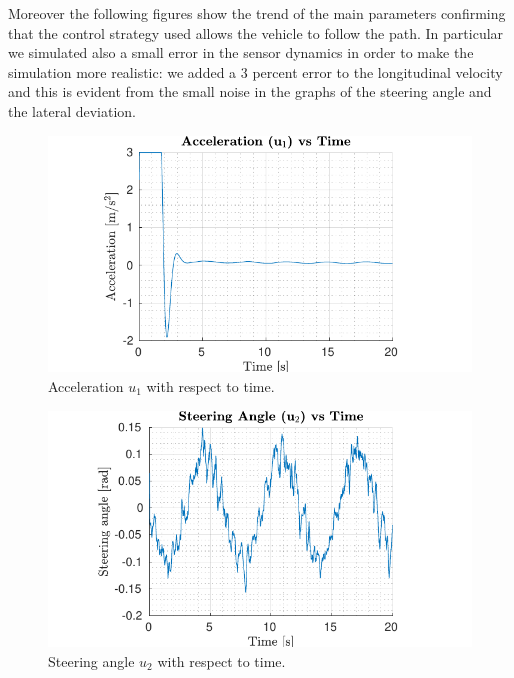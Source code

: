 \documentclass[conference, 11pt]{IEEEtran}
\begin{document}
Moreover the following figures show the trend of the main parameters confirming that the control strategy used allows the vehicle to follow the path. In particular we simulated also a small error in the sensor dynamics in order to make the simulation more realistic: we added a 3 percent error to the longitudinal velocity and this is evident from the small noise in the graphs of the steering angle and the lateral deviation.
\begin{figure}[!h]
	\centering
	\includegraphics[width=1\columnwidth]{../../MATLAB/lane_following/figure/AccelerationVsTime.pdf}
	\caption{Acceleration $u_1$ with respect to time.}
	\label{fig:acceleration_laneFollowing}
\end{figure}
\begin{figure}[!h]
	\centering
	\includegraphics[width=1\columnwidth]{../../MATLAB/lane_following/figure/SteeringAngleVsTime.pdf}
	\caption{Steering angle $u_2$ with respect to time.}
	\label{fig:steering_laneFollowing}
\end{figure}
\end{document}
